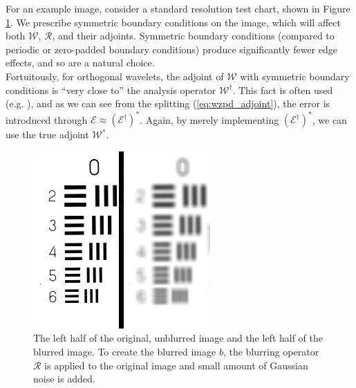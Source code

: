 \documentclass[journal]{IEEEtran}
\begin{document}
For an example image, consider a standard resolution test chart, shown in Figure \ref{fig:original}.  We prescribe symmetric boundary conditions on the image, which will affect both $\mathcal{W}$, $\mathcal{R}$, and their adjoints.  Symmetric boundary conditions (compared to periodic or zero-padded boundary conditions) produce significantly fewer edge effects, and so are a natural choice.\\

Fortuitously, for orthogonal wavelets, the adjoint of $\mathcal{W}$ with symmetric boundary conditions is ``very close to'' the analysis operator $\mathcal{W}^\dagger$.  This fact is often used (e.g. \cite{beck_2009}), and as we can see from the splitting (\ref{eq:wzpd_adjoint}), the error is introduced through $\mathcal{E} \approx \left(\mathcal{E}^\dagger\right)^\ast$.  Again, by merely implementing $\left(\mathcal{E}^\dagger\right)^\ast$, we can use the true adjoint $\mathcal{W}^\ast$.\\

\begin{figure}
   \centering
   \includegraphics[width=0.8\columnwidth]{figures/resolution_blurred_figure.png}
   \caption{The left half of the original, unblurred image and the left half of the blurred image.  To create the blurred image $b$, the blurring operator $\mathcal{R}$ is applied to the original image and small amount of Gaussian noise is added.}
   \label{fig:original}
\end{figure}
\end{document}
